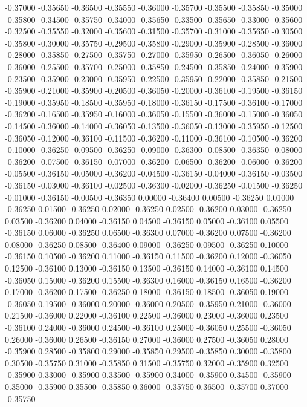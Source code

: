 {-0.37000 -0.35650
-0.36500 -0.35550
-0.36000 -0.35700
-0.35500 -0.35850
-0.35000 -0.35800
-0.34500 -0.35750
-0.34000 -0.35650
-0.33500 -0.35650
-0.33000 -0.35600
-0.32500 -0.35550
-0.32000 -0.35600
-0.31500 -0.35700
-0.31000 -0.35650
-0.30500 -0.35800
-0.30000 -0.35750
-0.29500 -0.35800
-0.29000 -0.35900
-0.28500 -0.36000
-0.28000 -0.35850
-0.27500 -0.35750
-0.27000 -0.35950
-0.26500 -0.36050
-0.26000 -0.36000
-0.25500 -0.35700
-0.25000 -0.35850
-0.24500 -0.35850
-0.24000 -0.35900
-0.23500 -0.35900
-0.23000 -0.35950
-0.22500 -0.35950
-0.22000 -0.35850
-0.21500 -0.35900
-0.21000 -0.35900
-0.20500 -0.36050
-0.20000 -0.36100
-0.19500 -0.36150
-0.19000 -0.35950
-0.18500 -0.35950
-0.18000 -0.36150
-0.17500 -0.36100
-0.17000 -0.36200
-0.16500 -0.35950
-0.16000 -0.36050
-0.15500 -0.36000
-0.15000 -0.36050
-0.14500 -0.36000
-0.14000 -0.36050
-0.13500 -0.36050
-0.13000 -0.35950
-0.12500 -0.36050
-0.12000 -0.36100
-0.11500 -0.36200
-0.11000 -0.36100
-0.10500 -0.36200
-0.10000 -0.36250
-0.09500 -0.36250
-0.09000 -0.36300
-0.08500 -0.36350
-0.08000 -0.36200
-0.07500 -0.36150
-0.07000 -0.36200
-0.06500 -0.36200
-0.06000 -0.36200
-0.05500 -0.36150
-0.05000 -0.36200
-0.04500 -0.36150
-0.04000 -0.36150
-0.03500 -0.36150
-0.03000 -0.36100
-0.02500 -0.36300
-0.02000 -0.36250
-0.01500 -0.36250
-0.01000 -0.36150
-0.00500 -0.36350
0.00000 -0.36400
0.00500 -0.36250
0.01000 -0.36250
0.01500 -0.36250
0.02000 -0.36250
0.02500 -0.36200
0.03000 -0.36250
0.03500 -0.36200
0.04000 -0.36150
0.04500 -0.36150
0.05000 -0.36100
0.05500 -0.36150
0.06000 -0.36250
0.06500 -0.36300
0.07000 -0.36200
0.07500 -0.36200
0.08000 -0.36250
0.08500 -0.36400
0.09000 -0.36250
0.09500 -0.36250
0.10000 -0.36150
0.10500 -0.36200
0.11000 -0.36150
0.11500 -0.36200
0.12000 -0.36050
0.12500 -0.36100
0.13000 -0.36150
0.13500 -0.36150
0.14000 -0.36100
0.14500 -0.36050
0.15000 -0.36200
0.15500 -0.36300
0.16000 -0.36150
0.16500 -0.36200
0.17000 -0.36200
0.17500 -0.36250
0.18000 -0.36150
0.18500 -0.36050
0.19000 -0.36050
0.19500 -0.36000
0.20000 -0.36000
0.20500 -0.35950
0.21000 -0.36000
0.21500 -0.36000
0.22000 -0.36100
0.22500 -0.36000
0.23000 -0.36000
0.23500 -0.36100
0.24000 -0.36000
0.24500 -0.36100
0.25000 -0.36050
0.25500 -0.36050
0.26000 -0.36000
0.26500 -0.36150
0.27000 -0.36000
0.27500 -0.36050
0.28000 -0.35900
0.28500 -0.35800
0.29000 -0.35850
0.29500 -0.35850
0.30000 -0.35800
0.30500 -0.35750
0.31000 -0.35850
0.31500 -0.35750
0.32000 -0.35900
0.32500 -0.35900
0.33000 -0.35900
0.33500 -0.35900
0.34000 -0.35900
0.34500 -0.35900
0.35000 -0.35900
0.35500 -0.35850
0.36000 -0.35750
0.36500 -0.35700
0.37000 -0.35750
}
